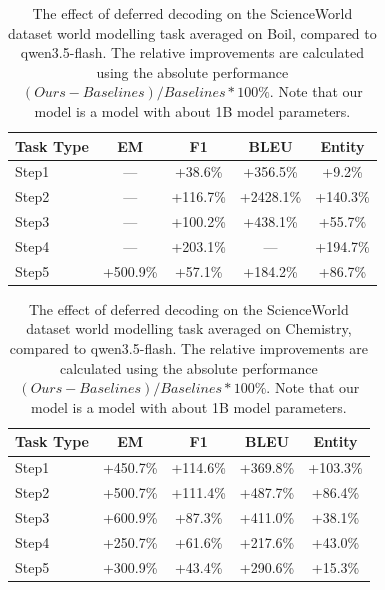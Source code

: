 \begin{table}[h]
\centering
    \setlength\tabcolsep{15pt}
    \setlength\extrarowheight{0pt}
\caption{The effect of deferred decoding on the ScienceWorld dataset \citep{wang-etal-2022-scienceworld} world modelling task averaged on Boil, compared to qwen3.5-flash. The relative improvements are calculated using the absolute performance $(Ours - Baselines) / Baselines * 100\%$. Note that our model is a model with about 1B model parameters.}
\label{tab:scienceworld13}
\begin{tabular}{lcccc}
\toprule
\textbf{Task Type} & \textbf{EM} & \textbf{F1}
  & \textbf{BLEU} & \textbf{Entity}\\
\midrule
Step1 & — & +38.6\% & +356.5\% & +9.2\% \\
Step2 & — & +116.7\% & +2428.1\% & +140.3\% \\
Step3 & — & +100.2\% & +438.1\% & +55.7\% \\
Step4 & — & +203.1\% & — & +194.7\% \\
Step5 & +500.9\% & +57.1\% & +184.2\% & +86.7\% \\

\bottomrule
\end{tabular}
\end{table}


\begin{table}[h]
\centering
    \setlength\tabcolsep{15pt}
    \setlength\extrarowheight{0pt}
\caption{The effect of deferred decoding on the ScienceWorld dataset \citep{wang-etal-2022-scienceworld} world modelling task averaged on Chemistry, compared to qwen3.5-flash. The relative improvements are calculated using the absolute performance $(Ours - Baselines) / Baselines * 100\%$. Note that our model is a model with about 1B model parameters.}
\label{tab:scienceworld14}
\begin{tabular}{lcccc}
\toprule
\textbf{Task Type} & \textbf{EM} & \textbf{F1}
  & \textbf{BLEU} & \textbf{Entity}\\
\midrule
Step1 & +450.7\% & +114.6\% & +369.8\% & +103.3\% \\
Step2 & +500.7\% & +111.4\% & +487.7\% & +86.4\% \\
Step3 & +600.9\% & +87.3\% & +411.0\% & +38.1\% \\
Step4 & +250.7\% & +61.6\% & +217.6\% & +43.0\% \\
Step5 & +300.9\% & +43.4\% & +290.6\% & +15.3\% \\

\bottomrule
\end{tabular}
\end{table}

